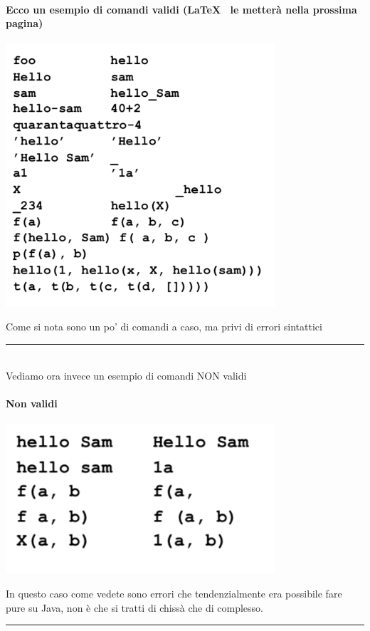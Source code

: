 \documentclass[12pt, a4paper, openany, oneside]{book}
\begin{document}
\paragraph{Ecco un esempio di comandi validi (\LaTeX ~ le metterà nella prossima 
pagina)}
\begin{center}
\includegraphics[width=0.75\textwidth]{validi}
\end{center}
Come si nota sono un po' di comandi a caso, ma privi di errori sintattici \\
{\color{black} \rule{\linewidth}{0.3mm} }
\\
Vediamo ora invece un esempio di comandi NON validi 
\paragraph{Non validi}
\begin{center}
\includegraphics[width=0.75\textwidth]{nonvalidi}
\end{center}
In questo caso come vedete sono errori che tendenzialmente era possibile fare 
pure su Java, non è che si tratti di chissà che di complesso. \\
{\color{black} \rule{\linewidth}{0.3mm} }
\\ \\
\end{document}

